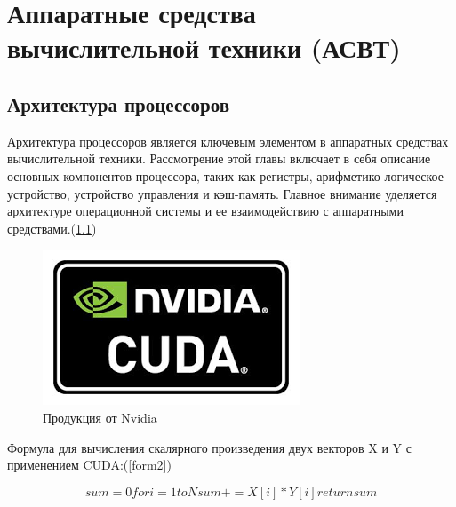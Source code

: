 \documentclass[a4paper, 14pt]{report}
\begin{document}
	\chapter{Аппаратные средства вычислительной техники (АСВТ)}
	\section{Архитектура процессоров}
	Архитектура процессоров является ключевым элементом в аппаратных средствах вычислительной техники. Рассмотрение этой главы включает в себя описание основных компонентов процессора, таких как регистры, арифметико-логическое устройство, устройство управления и кэш-память. Главное внимание уделяется архитектуре операционной системы и ее взаимодействию с аппаратными средствами.(\ref{cuda2})
	
	\begin{figure}[h]
		\centering
		\includegraphics[scale=0.7]{cuda}
		\caption{Продукция от Nvidia}
		\label{cuda2}
	\end{figure}

	 Формула для вычисления скалярного произведения двух векторов X и Y с применением CUDA:(\ref{form2})
	
	\begin{equation}
		sum = 0for i = 1 to N
    sum += X[i] * Y[i]return sum
		\label{form2}
	\end{equation}
	
	
	
	
	
\end{document}
